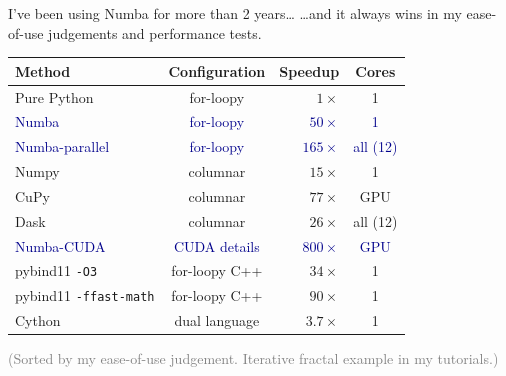 \documentclass[aspectratio=169]{beamer}
\begin{document}
\begin{frame}{I've been using Numba for more than 2 years\ldots}
\vspace{0.5 cm}
{\large \ldots and it always wins in my ease-of-use judgements and performance tests.}

\begin{center}
\begin{tabular}{l c r c}
{\bf Method}               & {\bf Configuration} & {\bf Speedup} & {\bf Cores} \\\hline
Pure Python                & for-loopy           &     $1\times$ & 1 \\
\textcolor{darkblue}{Numba}                      & \textcolor{darkblue}{for-loopy}           &    \textcolor{darkblue}{$50\times$} & \textcolor{darkblue}{1} \\
\textcolor{darkblue}{Numba-parallel}             & \textcolor{darkblue}{for-loopy}           &   \textcolor{darkblue}{$165\times$} & \textcolor{darkblue}{all (12)} \\
Numpy                      & columnar            &    $15\times$ & 1 \\
CuPy                       & columnar            &    $77\times$ & GPU \\
Dask                       & columnar            &    $26\times$ & all (12) \\
\textcolor{darkblue}{Numba-CUDA}                 & \textcolor{darkblue}{CUDA details}        &   \textcolor{darkblue}{$800\times$} & \textcolor{darkblue}{GPU} \\
pybind11 {\tt -O3}         & for-loopy C++       &    $34\times$ & 1 \\
pybind11 {\tt -ffast-math} & for-loopy C++       &    $90\times$ & 1 \\
Cython                     & dual language       &   $3.7\times$ & 1 \\
\end{tabular}
\end{center}

\textcolor{gray}{(Sorted by my ease-of-use judgement. Iterative fractal example in my tutorials.)}
\end{frame}
\end{document}
